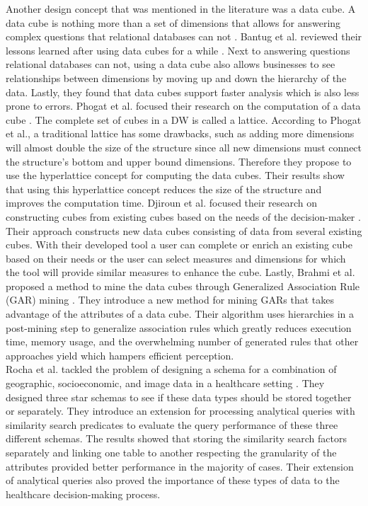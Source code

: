 \documentclass[11pt]{article}
\begin{document}
Another design concept that was mentioned in the literature was a data cube. A data cube is nothing more than a set of dimensions that allows for answering complex questions that relational databases can not \cite{Bantug2018}. Bantug et al. reviewed their lessons learned after using data cubes for a while \cite{Bantug2018}. Next to answering questions relational databases can not, using a data cube also allows businesses to see relationships between dimensions by moving up and down the hierarchy of the data. Lastly, they found that data cubes support faster analysis which is also less prone to errors. Phogat et al. focused their research on the computation of a data cube \cite{Phogat2023697}. The complete set of cubes in a DW is called a lattice. According to Phogat et al., a traditional lattice has some drawbacks, such as adding more dimensions will almost double the size of the structure since all new dimensions must connect the structure's bottom and upper bound dimensions. Therefore they propose to use the hyperlattice concept for computing the data cubes. Their results show that using this hyperlattice concept reduces the size of the structure and improves the computation time. Djiroun et al. focused their research on constructing cubes from existing cubes based on the needs of the decision-maker \cite{Djiroun2019783}. Their approach constructs new data cubes consisting of data from several existing cubes. With their developed tool a user can complete or enrich an existing cube based on their needs or the user can select measures and dimensions for which the tool will provide similar measures to enhance the cube. Lastly, Brahmi et al. proposed a method to mine the data cubes through Generalized Association Rule (GAR) mining \cite{Brahmi2019153}. They introduce a new method for mining GARs that takes advantage of the attributes of a data cube. Their algorithm uses hierarchies in a post-mining step to generalize association rules which greatly reduces execution time, memory usage, and the overwhelming number of generated rules that other approaches yield which hampers efficient perception. \\

Rocha et al. tackled the problem of designing a schema for a combination of geographic, socioeconomic, and image data in a healthcare setting \cite{Rocha202085}. They designed three star schemas to see if these data types should be stored together or separately. They introduce an extension for processing analytical queries with similarity search predicates to evaluate the query performance of these three different schemas. The results showed that storing the similarity search factors separately and linking one table to another respecting the granularity of the attributes provided better performance in the majority of cases. Their extension of analytical queries also proved the importance of these types of data to the healthcare decision-making process. \\
\end{document}
